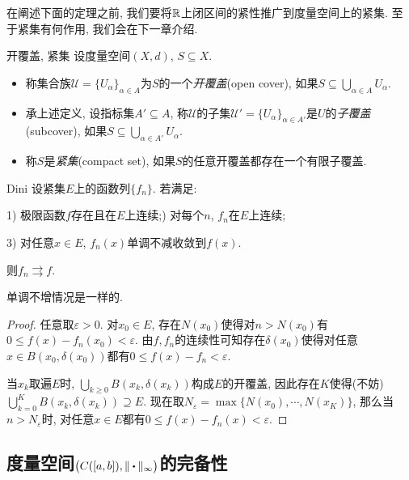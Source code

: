 在阐述下面的定理之前, 我们要将$\mathbb{R}$上闭区间的紧性推广到度量空间上的紧集. 至于紧集有何作用, 我们会在下一章介绍. 

\begin{definition}{开覆盖, 紧集}
	设度量空间$(X,d)$, $S \subseteq X$. 
	\begin{itemize}
		\item 称集合族$\mathcal{U} = \{ U_{\alpha} \}_{\alpha \in A}$为$S$的一个\textit{开覆盖}(open cover), 如果$S \subseteq \bigcup_{\alpha \in A} U_{\alpha}$. 
		\item 承上述定义, 设指标集$A' \subseteq A$, 称$\mathcal{U}$的子集$\mathcal{U}'= \{ U_{\alpha} \}_{\alpha \in A'}$是$U$的\textit{子覆盖}(subcover), 如果$S \subseteq \bigcup_{\alpha \in A'} U_{\alpha}$. 
		\item 称$S$是\textit{紧集}(compact set), 如果$S$的任意开覆盖都存在一个有限子覆盖. 
	\end{itemize}
\end{definition}

\begin{theorem}{Dini}
	设紧集$E$上的函数列$\{ f_n \}$. 若满足: 
	
	1) 极限函数$f$存在且在$E$上连续;) 对每个$n$, $f_n$在$E$上连续;
	
	3) 对任意$x \in E$, $f_n(x)$单调不减收敛到$f(x)$. 
	
	\noindent
	则$f_n \rightrightarrows f$. 
\end{theorem}
\begin{remark}
	单调不增情况是一样的. 
\end{remark}
\begin{proof}
	任意取$\varepsilon >0$. 对$x_0 \in E$, 存在$N(x_0)$使得对$n>N(x_0)$有$0 \leq f(x)-f_{n}(x_0) < \varepsilon$. 由$f,f_n$的连续性可知存在$\delta (x_0)$使得对任意$x \in B(x_0,\delta (x_0))$都有$0 \leq f(x)-f_{n} < \varepsilon$. 
	
	当$x_k$取遍$E$时, $\bigcup_{k\geq 0}B(x_k,\delta (x_k))$构成$E$的开覆盖, 因此存在$K$使得(不妨)$\bigcup_{k=0}^{K}B(x_k,\delta (x_k)) \supseteq E$. 现在取$N_\varepsilon = \max \{ N(x_0),\cdots ,N(x_K) \}$, 那么当$n>N_\varepsilon$时, 对任意$x \in E$都有$0 \leq f(x) - f_n(x) < \varepsilon$. 
\end{proof}


\subsection{度量空间$\big( C([a,b]),\| \bigcdot \|_{\infty} \big)$的完备性}

